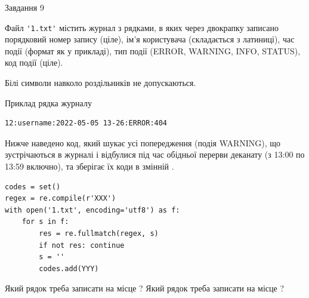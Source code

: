 \documentclass[12pt, ukrainian]{article}
\def\code#1{\Verb!#1!}
\begin{document}
{\begin{minipage}[t]{8.0cm}
\end{minipage}

               
{\begin{center}Завдання {9}\end{center}}
\vspace{-4mm}
Файл \code{'1.txt'} містить журнал з рядками, в яких через двокрапку записано поряд\-ко\-вий номер запису (ціле), ім'я користувача (складається з латиниці), час події (фор\-мат як у прикладі), тип події (ERROR, WARNING, INFO, STATUS), код події (ціле).

Білі символи навколо роздільників не допускаються.

Приклад рядка журналу



\begin{verbatim}
12:username:2022-05-05 13-26:ERROR:404
\end{verbatim}


Нижче наведено код, який шукає усі попередження (подія WARNING), що зустрі\-ча\-ються в журналі і відбулися під час обідньої перерви деканату (з 13:00 по 13:59 включно), та зберігає їх коди в змінній .



\begin{verbatim}
codes = set()
regex = re.compile(r'XXX')
with open('1.txt', encoding='utf8') as f:
    for s in f:
        res = re.fullmatch(regex, s)
        if not res: continue
        s = ''
        codes.add(YYY)
\end{verbatim}





Який рядок треба записати на місце  ?
Який рядок треба записати на місце  ?\par

}
\end{document}
